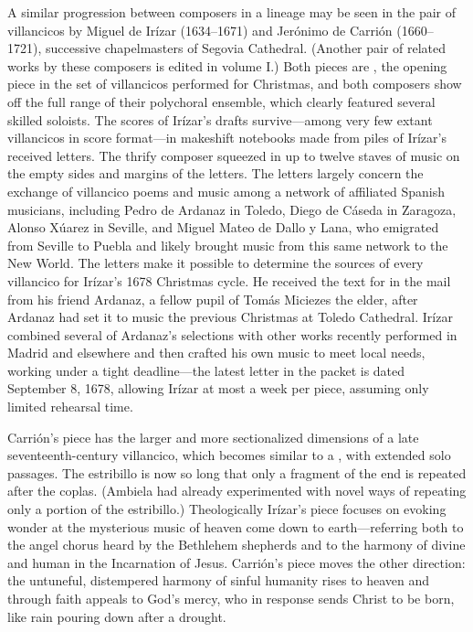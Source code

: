 A similar progression between composers in a lineage may be seen in the pair
of villancicos by Miguel de Irízar (1634--1671) and Jerónimo de Carrión
(1660--1721), successive chapelmasters of Segovia Cathedral.%
    \Autocite{Cashner:Segovia}
(Another pair of related works by these composers is edited in volume I.)
Both pieces are , the opening piece in the set of
villancicos performed for Christmas, and both composers show off the full
range of their polychoral ensemble, which clearly featured several skilled
soloists.
The scores of Irízar's drafts survive---among very few extant villancicos in
score format---in makeshift notebooks made from piles of Irízar's received
letters.
The thrify composer squeezed in up to twelve staves of music on the empty
sides and margins of the letters.
The letters largely concern the exchange of villancico poems and music among a
network of affiliated Spanish musicians, including Pedro de Ardanaz in Toledo,
Diego de Cáseda in Zaragoza, Alonso Xúarez in Seville, and Miguel Mateo
de Dallo y Lana, who emigrated from Seville to Puebla and likely brought music
from this same network to the New World.
The letters make it possible to determine the sources of every villancico for
Irízar's 1678 Christmas cycle.%
    \Autocites
    {Rodriguez:Networks}
    {Rodriguez:SoloMadrid}
He received the text for  in the mail from his
friend Ardanaz, a fellow pupil of Tomás Miciezes the elder, after Ardanaz had
set it to music the previous Christmas at Toledo Cathedral.
Irízar combined several of Ardanaz's selections with other works recently
performed in Madrid and elsewhere and then crafted his own music to meet local
needs, working under a tight deadline---the latest letter in the packet is
dated September 8, 1678, allowing Irízar at most a week per piece, assuming
only limited rehearsal time.

Carrión's piece has the larger and more sectionalized dimensions of a late
seventeenth-century villancico, which becomes similar to a ,
with extended solo passages.
The estribillo is now so long that only a fragment of the end is repeated
after the coplas.
(Ambiela had already experimented with novel ways of repeating only a portion
of the estribillo.)%
    \Autocites
    {Calahorra:Suban}
    {Torrente:Estribillo}
Theologically Irízar's piece focuses on evoking wonder at the mysterious music
of heaven come down to earth---referring both to the angel chorus heard by the
Bethlehem shepherds and to the harmony of divine and human in the Incarnation
of Jesus.
Carrión's piece moves the other direction: the untuneful, distempered harmony
of sinful humanity rises to heaven and through faith appeals to God's mercy,
who in response sends Christ to be born, like rain pouring down after a
drought.

